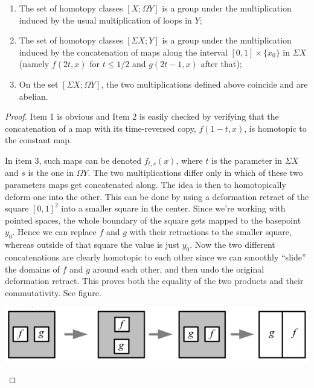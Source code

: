 \begin{prop}\label{suspension maps prop}
    \begin{enumerate}
        \item The set of homotopy classes $[X;\Omega Y]$ is a group under the multiplication induced by the usual multiplication of loops in $Y$;
        \item The set of homotopy classes $[\Sigma X;Y]$ is a group under the multiplication induced by the concatenation of maps along the interval $[0,1]\times\{x_0\}$ in $\Sigma X$ (namely $f(2t,x)$ for $t\leq 1/2$ and $g(2t-1,x)$ after that);
        \item On the set $[\Sigma X;\Omega Y]$, the two multiplications defined above coincide and are abelian.
    \end{enumerate}
\end{prop}
\begin{proof}
    Item 1 is obvious and Item 2 is easily checked by verifying that the concatenation of a map with its time-reversed copy, $f(1-t,x)$, is homotopic to the constant map.

    In item 3, such maps can be denoted $f_{t,s}(x)$, where $t$ is the parameter in $\Sigma X$ and $s$ is the one in $\Omega Y$. The two multiplications differ only in which of these two parameters maps get concatenated along. The idea is then to homotopically deform one into the other. This can be done by using a deformation retract of the square $[0,1]^2$ into a smaller square in the center.  Since we're working with pointed spaces, the whole boundary of the square gets mapped to the basepoint $y_0$. Hence we can replace $f$ and $g$ with their retractions to the smaller square, whereas outside of that square the value is just $y_0$. Now the two different concatenations are clearly homotopic to each other since we can smoothly ``slide'' the domains of $f$ and $g$ around each other, and then undo the original deformation retract. This proves both the equality of the two products and their commutativity. See figure.
    \begin{center}
    \includegraphics[scale=1]{figures/higher-homotopy.png}
    \end{center}
\end{proof}

